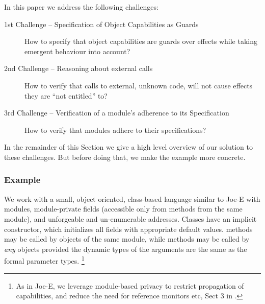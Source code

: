 \noindent
In this paper we address the following challenges:
\begin{description}
\item[1st Challenge -- Specification of Object Capabilities as Guards] How to specify that object capabilities are guards over effects while taking emergent behaviour into account?
\item[2nd Challenge -- Reasoning about external calls] How to verify that calls to external, unknown code, will not cause effects they are  ``not entitled'' to?
\item[3rd Challenge -- Verification of a module's adherence to its Specification] How to verify that modules adhere to their specifications?
\end{description}


\noindent In the remainder of this Section %
 we give a high level overview of our solution to these challenges.
But before doing that, we make the example more concrete. %

 \subsubsection{Example} %
{We work with} a  small, object oriented, class-based  language similar to Joe-E \cite{JoeE} with modules,   module-private fields
({accessible} only from   methods {from} the same module),  
and unforgeable and un-enumerable addresses.
Classes have an {implicit} constructor, which   initializes all fields with appropriate default values.
{ methods  {may be} called by objects of the same module,  while   methods  may be called by \emph{any} objects %
{provided the dynamic types of the arguments are the same as} the formal parameter types.}
 \footnote{As in Joe-E, we leverage  module-based privacy to restrict propagation of capabilities, and reduce the need for reference monitors etc, \cf Sect 3 in  \cite{JoeE}.}   


